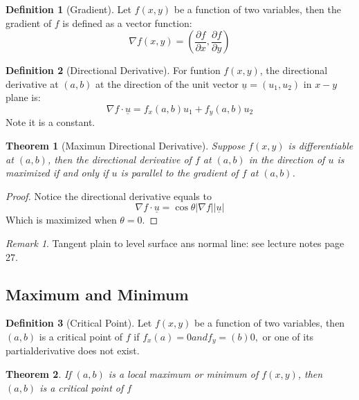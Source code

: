 \documentclass[12pt,a4paper]{article}
\newtheorem{theorem}{Theorem}[subsection]
\theoremstyle{definition}
\newtheorem{definition}{Definition}[section]
\theoremstyle{remark}
\newtheorem{remark}{Remark}[section]
\begin{document}
\begin{definition}[Gradient]
	Let $f(x,y)$ be a function of two variables, then the gradient of $f$ is defined as a vector function: 
	\[
\nabla f(x,y) = \left( \frac{\partial f}{\partial x}, \frac{\partial f}{\partial y} \right)
	\]
\end{definition}

\begin{definition}[Directional Derivative]
	For funtion $f(x,y)$, the directional derivative at $(a,b)$ at the direction of the unit vector $\underline{u} = (u_1, u_2)$ in $x-y$ plane is:
\[
	\nabla f \cdot \underline{u} = f_x(a,b) u_1 + f_y(a,b) u_2
\]
Note it is a constant.
\end{definition}
\begin{theorem}[Maximun Directional Derivative]
	Suppose $f(x,y)$ is differentiable at $(a,b)$, then the directional derivative of $f$ at $(a,b)$ in the direction of $u$ is maximized if and only if $u$ is parallel to the gradient of $f$ at $(a,b)$.
\end{theorem}
\begin{proof}
Notice the directional derivative equals to
\[
	\nabla f \cdot \underline{u} = \cos{\theta} | \nabla f | | \underline{u} |
\]
Which is maximized when $\theta = 0$.
\end{proof}
\begin{remark}
	Tangent plain to level surface ans normal line: see lecture notes page 27.
	
\end{remark}

\subsection{Maximum and Minimum}
\begin{definition}[Critical Point]
	Let $f(x,y)$ be a function of two variables, then $(a,b)$ is a critical point of $f$ if $f_x(a)=0 and f_y=(b)0,$ or one of its partialderivative does not exist.
\end{definition}

\begin{theorem}
	If $(a,b)$ is a local maximum or minimum of $f(x,y)$, then $(a,b) $ is a critical point of $f$
\end{theorem}
\end{document}
